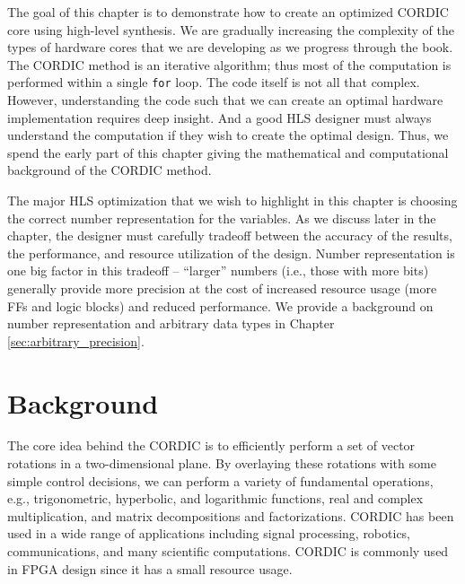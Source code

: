 
The goal of this chapter is to demonstrate how to create an optimized CORDIC core using high-level synthesis. We are gradually increasing the complexity of the types of hardware cores that we are developing as we progress through the book. The CORDIC method is an iterative algorithm; thus most of the computation is performed within a single \lstinline|for| loop. The code itself is not all that complex. However, understanding the code such that we can create an optimal hardware implementation requires deep insight. And a good HLS designer must always understand the computation if they wish to create the optimal design. Thus, we spend the early part of this chapter giving the mathematical and computational background of the CORDIC method.  

The major HLS optimization that we wish to highlight in this chapter is choosing the correct number representation for the variables. As we discuss later in the chapter, the designer must carefully tradeoff between the accuracy of the results, the performance, and resource utilization of the design. Number representation is one big factor in this tradeoff -- ``larger'' numbers (i.e., those with more bits) generally provide more precision at the cost of increased resource usage (more FFs and logic blocks) and reduced performance. We provide a background on number representation and arbitrary data types in Chapter \ref{sec:arbitrary_precision}. 


\section{Background}
\label{subsec:CORDIC_Basics}

The core idea behind the CORDIC is to efficiently perform a set of vector rotations in a two-dimensional plane. By overlaying these rotations with some simple control decisions, we can perform a variety of fundamental operations, e.g., trigonometric, hyperbolic, and logarithmic functions, real and complex multiplication, and matrix decompositions and factorizations.  CORDIC has been used in a wide range of applications including signal processing, robotics, communications, and many scientific computations. CORDIC is commonly used in FPGA design since it has a small resource usage. 

